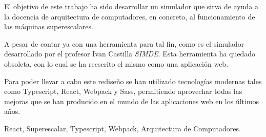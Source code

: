 {\em

El objetivo de este trabajo ha sido desarrollar un simulador que sirva de ayuda a la docencia
de arquitectura de computadores, en concreto, al funcionamiento de las máquinas superescalares.

\bigskip
A pesar de contar ya con una herramienta para tal fin, como es el simulador desarrollado por el 
profesor Ivan Castilla \textit{SIMDE}. Esta herramienta ha quedado obsoleta, con lo cual se ha 
reescrito el mismo como una aplicación web.

\bigskip
Para poder llevar a cabo este rediseño se han utilizado tecnologías modernas tales como Typescript, 
React, Webpack y Sass, permitiendo aprovechar todas las mejoras que se han producido en el mundo
de las aplicaciones web en los últimos años.

}

\begin{palabrasClave}
React, Superescalar, Typescript, Webpack, Arquitectura de Computadores.
\end{palabrasClave}
